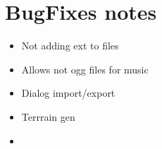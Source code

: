 \section{BugFixes notes}

\begin{itemize}
	\item Not adding ext to files
	\item Allows not ogg files for music
	\item Dialog import/export
	\item Terrrain gen
	\item 
\end{itemize}